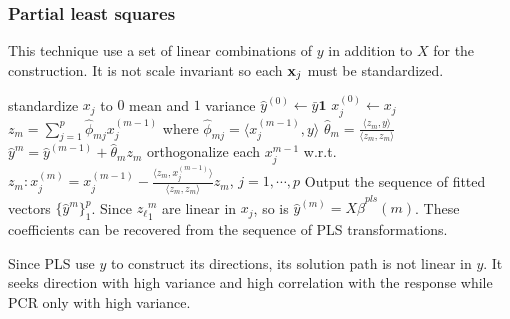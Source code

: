 
\subsubsection{Partial least squares}
This technique use a set of linear combinations of $y$ in addition to $X$ for the construction. It is not scale invariant so each $\mathbf{x}_j$ must be standardized.
\begin{algorithm}
standardize $x_j$ to $0$ mean and $1$ variance\;
$\hat{y}^{(0)}\leftarrow \bar{y}\mathbf{1}$\;
$x_j^{(0)} \leftarrow x_j$ \;
{
    $z_m  = \sum_{j=1}^p \hat{\phi}_{mj} x_j^{(m-1)}$ where $\hat{\phi}_{mj} = \langle x_j^{(m-1)}, y\rangle$ \; 
    $\hat{\theta}_m = \frac{\langle z_m, y\rangle}{\langle z_m, z_m\rangle} $\;
    $\hat{y}^m = \hat{y}^{(m-1)} + \hat{\theta}_m z_m$\;
    orthogonalize each $x_j^{m-1}$ w.r.t. $z_m: x_j^{(m)} = x_j^{(m-1)} - \frac{\langle z_m, x_j^{(m-1)}\rangle}{\langle z_m, z_m\rangle} z_m$, $j=1,\cdots, p$\;
}
Output the sequence of fitted vectors $\{\hat{y}^m\}_1^p$. Since ${z_\ell}_1^m$ are linear in $x_j$, so is $\hat{y}^{(m)} = X \hat{\beta}^{pls}(m)$. These coefficients can be recovered from the sequence of PLS transformations.
\end{algorithm}

Since PLS use $y$ to construct its directions, its solution path is not linear in $y$. It seeks direction with high variance and high correlation with the response while PCR only with high variance.

